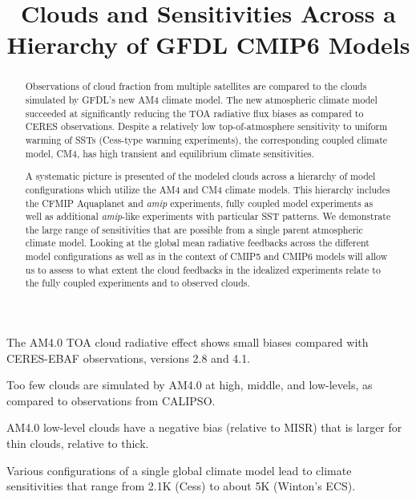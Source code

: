 \documentclass[draft]{agujournal2019}
\begin{document}
\title{Clouds and Sensitivities Across a Hierarchy of GFDL CMIP6 Models}


\begin{keypoints}
  \item{The AM4.0 TOA cloud radiative effect shows small biases compared with CERES-EBAF observations, versions 
  2.8 and 4.1.}
  \item{Too few clouds are simulated by AM4.0 at high, middle, and low-levels, as compared to observations from CALIPSO.}
  \item{AM4.0 low-level clouds have a negative bias (relative to MISR) that is larger for thin clouds, relative to thick.}
  \item{Various configurations of a single global climate model lead to climate sensitivities that range from 2.1K (Cess) to 
  about 5K (Winton's ECS).}
\end{keypoints}


\begin{abstract}
Observations of cloud fraction from multiple satellites are compared to the clouds simulated by 
GFDL's new AM4 climate model.  
The new atmospheric climate model succeeded at significantly reducing the TOA radiative flux biases as compared 
to CERES observations.  Despite a relatively low top-of-atmosphere sensitivity to uniform warming of SSTs 
(Cess-type warming experiments), the corresponding coupled climate model, CM4, has high transient and 
equilibrium climate sensitivities.  

A systematic picture is presented of the modeled clouds across a hierarchy of model configurations which utilize 
the AM4 and CM4 climate models.  This hierarchy includes the CFMIP Aquaplanet and \textit{amip} experiments, 
fully coupled model experiments as well as additional \textit{amip}-like experiments with particular SST patterns.  
We demonstrate the large range of sensitivities that are possible from a single parent atmospheric climate model.   
Looking at the global mean radiative feedbacks across the different model configurations as well as in the context 
of CMIP5 and CMIP6 models will allow us to assess to what extent the cloud feedbacks in the idealized 
experiments relate to the fully coupled experiments and to observed clouds.  
\end{abstract}
\end{document}
